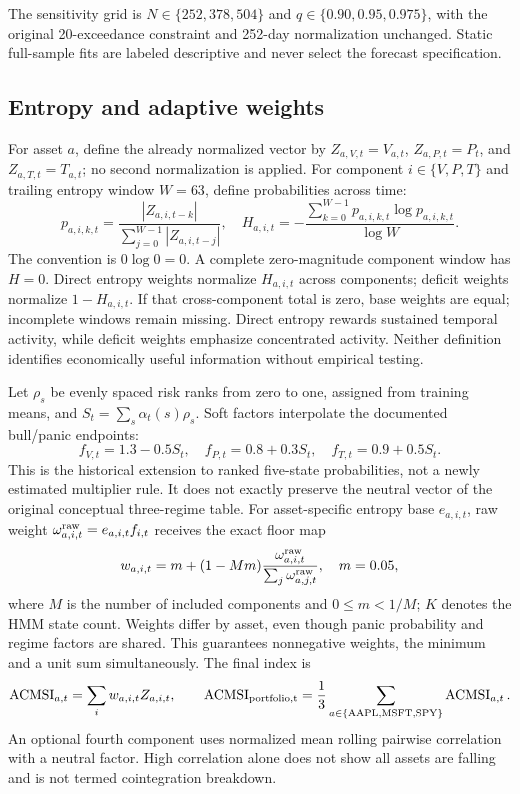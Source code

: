 \documentclass[11pt]{article}
\begin{document}
The sensitivity grid is $N\in\{252,378,504\}$ and $q\in\{0.90,0.95,0.975\}$, with the original
20-exceedance constraint and 252-day normalization unchanged. Static full-sample fits are labeled
descriptive and never select the forecast specification.

\subsection{Entropy and adaptive weights}
For asset $a$, define the already normalized vector by $Z_{a,V,t}=V_{a,t}$,
$Z_{a,P,t}=P_t$, and $Z_{a,T,t}=T_{a,t}$; no second normalization is applied.
For component $i\in\{V,P,T\}$ and trailing entropy window $W=63$, define probabilities across time:
\begin{equation}
p_{a,i,k,t}=\frac{|Z_{a,i,t-k}|}{\sum_{j=0}^{W-1}|Z_{a,i,t-j}|},\quad
H_{a,i,t}=-\frac{\sum_{k=0}^{W-1}p_{a,i,k,t}\log p_{a,i,k,t}}{\log W}.
\end{equation}
The convention is $0\log0=0$. A complete zero-magnitude component window has $H=0$.
Direct entropy weights normalize $H_{a,i,t}$ across components; deficit weights normalize
$1-H_{a,i,t}$. If that cross-component total is zero, base weights are equal;
incomplete windows remain missing. Direct entropy rewards
sustained temporal activity, while deficit weights emphasize concentrated activity. Neither definition
identifies economically useful information without empirical testing.

Let $\rho_s$ be evenly spaced risk ranks from zero to one, assigned from training means, and
$S_t=\sum_s\alpha_t(s)\rho_s$. Soft factors interpolate the documented bull/panic endpoints:
\begin{equation}
f_{V,t}=1.3-0.5S_t,\quad f_{P,t}=0.8+0.3S_t,\quad f_{T,t}=0.9+0.5S_t.
\end{equation}
This is the historical extension to ranked five-state probabilities, not a newly estimated multiplier
rule. It does not exactly preserve the neutral vector of the original conceptual three-regime table.
For asset-specific entropy base $e_{a,i,t}$, raw weight
$\omega^{\rm raw}_{a,i,t}=e_{a,i,t}f_{i,t}$ receives the exact floor map
\begin{equation}
w_{a,i,t}=m+(1-Mm)\frac{\omega^{\rm raw}_{a,i,t}}{\sum_j\omega^{\rm raw}_{a,j,t}},\quad m=0.05,
\end{equation}
where $M$ is the number of included components and $0\leq m<1/M$; $K$ denotes the HMM state count.
Weights differ by asset, even though panic probability and regime factors are shared. This guarantees nonnegative
weights, the minimum and a unit sum simultaneously. The final index is
\begin{equation}
\operatorname{ACMSI}_{a,t}=\sum_iw_{a,i,t}Z_{a,i,t},\qquad
\operatorname{ACMSI}_{\rm portfolio,t}=\frac13\sum_{a\in\{\mathrm{AAPL,MSFT,SPY}\}}
\operatorname{ACMSI}_{a,t}.
\end{equation}
An optional fourth component uses normalized mean rolling pairwise correlation with a neutral factor.
High correlation alone does not show all assets are falling and is not termed cointegration breakdown.
\end{document}
